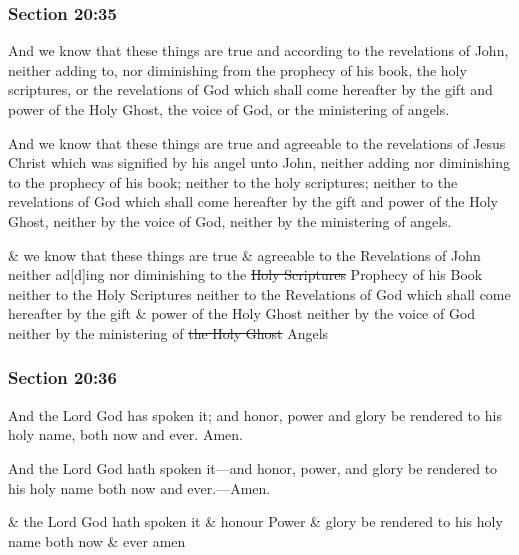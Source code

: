 	\subsubsection{Section 20:35} %
		\label{DC20-35}

		And we know that these things are true and according to the revelations of John, neither adding to, nor diminishing from the prophecy of his book, the holy scriptures, or the revelations of God which shall come hereafter by the gift and power of the Holy Ghost, the voice of God, or the ministering of angels.

		\begin{framed}
		\scriptsize
			\begin{compactdesc}
				\item[JSP] And we know that these things are true and agreeable to the revelations of Jesus Christ which was signified by his angel unto John, neither adding nor diminishing to the prophecy of his book; neither to the holy scriptures; neither to the revelations of God which shall come hereafter by the gift and power of the Holy Ghost, neither by the voice of God, neither by the ministering of angels.
				\item[RB1] \& we know that these things are true \& agreeable to the Revelations of John neither ad[d]ing nor diminishing to the \sout{Holy Scriptures} Prophecy of his Book neither to the Holy Scriptures neither to the Revelations of God which shall come hereafter by the gift \& power of the Holy Ghost neither by the voice of God neither by the ministering of \sout{the Holy Ghost} Angels
			\end{compactdesc}
		\end{framed}

	\subsubsection{Section 20:36} %
		\label{DC20-36}

		And the Lord God has spoken it; and honor, power and glory be rendered to his holy name, both now and ever. Amen.

		\begin{framed}
		\scriptsize
			\begin{compactdesc}
				\item[JSP] And the Lord God hath spoken it---and honor, power, and glory be rendered to his holy name both now and ever.---Amen.
				\item[RB1] \& the Lord God hath spoken it \& honour Power \& glory be rendered to his holy name both now \& ever amen
			\end{compactdesc}
		\end{framed}

